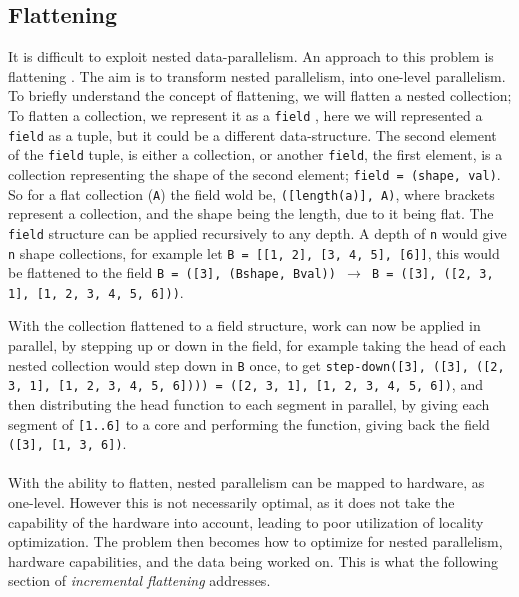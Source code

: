 \subsection{Flattening}
\label{flattening}
It is difficult to exploit nested data-parallelism. An approach to this problem is flattening \cite{flat}. The aim is to transform nested parallelism, into one-level parallelism. To briefly understand the concept of
flattening, we will flatten a nested collection; To flatten a collection, we represent it as a \texttt{field} \cite{flat}, here we will represented a \texttt{field} as a tuple, but it could be a different data-structure. The second element of the \texttt{field} tuple, is either a collection, or another \texttt{field}, the first element, is a collection representing the shape of the second element; \texttt{field = (shape, val)}. So for a flat collection (\texttt{A}) the field wold be, \texttt{([length(a)], A)}, where brackets represent a collection, and the shape being the length, due to it being flat.
The \texttt{field} structure can be applied recursively to any depth. A depth of \texttt{n} would give \texttt{n} shape collections, for example let \texttt{B = [[1, 2], [3, 4, 5], [6]]}, this would be flattened to the field \texttt{B = ([3], (Bshape, Bval)) $\to$ B = ([3], ([2, 3, 1], [1, 2, 3, 4, 5, 6]))}. 

With the collection flattened to a field structure, work can now be applied in parallel, by stepping up or down in the field, for example taking the head of each nested collection would step down in \texttt{B} once, to get \texttt{step-down([3], ([3], ([2, 3, 1], [1, 2, 3, 4, 5, 6]))) = ([2, 3, 1], [1, 2, 3, 4, 5, 6])}, and then distributing the head function to each segment in parallel, by giving each segment of \texttt{[1..6]} to a core and performing the function, giving back the field \texttt{([3], [1, 3, 6])}.\\\\
With the ability to flatten, nested parallelism can be mapped to hardware, as one-level. However this is not necessarily optimal, as it does not take the capability of the hardware into account, leading to poor utilization of locality optimization. The problem then becomes how to optimize for nested parallelism, hardware capabilities, and the data being worked on. This is what the following section of \textit{incremental flattening} addresses.

